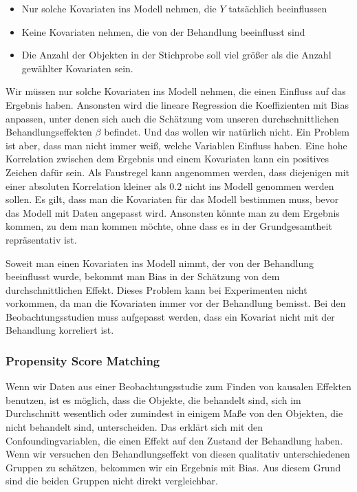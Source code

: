 \documentclass[12pt,a4paper,twoside]{scrartcl}
\numberwithin{equation}{section}
\begin{document}
\begin{itemize}
  \item Nur solche Kovariaten ins Modell nehmen, die $Y$ tatsächlich beeinflussen 
  \item Keine Kovariaten nehmen, die von der Behandlung beeinflusst sind
  \item Die Anzahl der Objekten in der Stichprobe soll viel größer als die Anzahl gewählter Kovariaten sein.
\end{itemize}

\noindent
Wir müssen nur solche Kovariaten ins Modell nehmen, die einen Einfluss auf das Ergebnis haben. Ansonsten wird die lineare Regression die Koeffizienten mit Bias anpassen, unter denen sich auch die Schätzung vom unseren durchschnittlichen Behandlungseffekten $\beta$ befindet. Und das wollen wir natürlich nicht. Ein Problem ist aber, dass man nicht immer weiß, welche Variablen Einfluss haben. Eine hohe Korrelation zwischen dem Ergebnis und einem Kovariaten kann ein positives Zeichen dafür sein. Als Faustregel kann angenommen werden, dass diejenigen mit einer absoluten Korrelation kleiner als 0.2 nicht ins Modell genommen werden sollen. Es gilt, dass man die Kovariaten für das Modell bestimmen muss, bevor das Modell mit Daten angepasst wird. Ansonsten könnte man zu dem Ergebnis kommen, zu dem man kommen möchte, ohne dass es in der Grundgesamtheit repräsentativ ist\cite{cox1982biometrics}\cite{WinLin}. \par

\noindent
Soweit man einen Kovariaten ins Modell nimmt, der von der Behandlung beeinflusst wurde, bekommt man Bias in der Schätzung von dem durchschnittlichen Effekt. Dieses Problem kann bei Experimenten nicht vorkommen, da man die Kovariaten immer vor der Behandlung bemisst. Bei den Beobachtungsstudien muss aufgepasst werden, dass ein Kovariat nicht mit der Behandlung korreliert ist.\cite{LinDol}\par

\subsubsection{Propensity Score Matching}\label{subsubsec:propensityScoreMatching}
Wenn wir Daten aus einer Beobachtungsstudie zum Finden von kausalen Effekten benutzen, ist es möglich, dass die Objekte, die behandelt sind, sich im Durchschnitt wesentlich oder zumindest in einigem Maße von den Objekten, die nicht behandelt sind, unterscheiden. Das erklärt sich mit den Confoundingvariablen, die einen Effekt auf den Zustand der Behandlung haben. Wenn wir versuchen den Behandlungseffekt von diesen qualitativ unterschiedenen Gruppen zu schätzen, bekommen wir ein Ergebnis mit Bias. Aus diesem Grund sind die beiden Gruppen nicht direkt vergleichbar.\par
\end{document}
